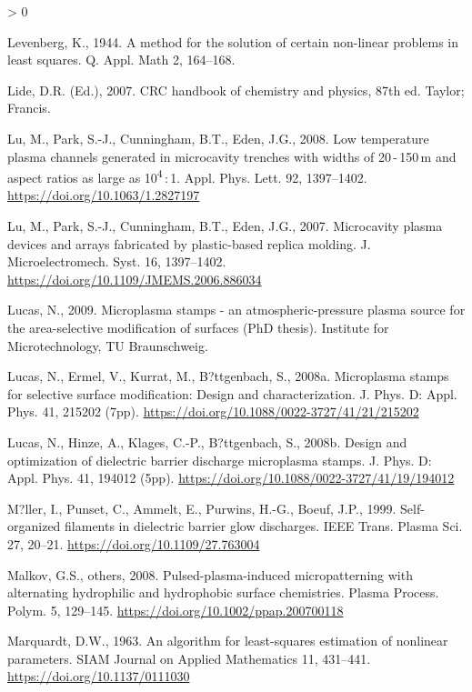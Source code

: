 \documentclass[
  11pt,
  twoside]{article}
\newlength{\cslhangindent}
\newenvironment{CSLReferences}[2] %
 {%
  \setlength{\parindent}{0pt}
  \ifodd #1 \everypar{\setlength{\hangindent}{\cslhangindent}}\ignorespaces\fi
  \ifnum #2 > 0
  \setlength{\parskip}{#2\baselineskip}
  \fi
 }%
 {}
\begin{document}
\begin{CSLReferences}{1}{0}
\leavevmode\hypertarget{ref-Leve1944}{}%
Levenberg, K., 1944. A method for the solution of certain non-linear problems in least squares. Q. Appl. Math 2, 164--168.

\leavevmode\hypertarget{ref-CRC07}{}%
Lide, D.R. (Ed.), 2007. CRC handbook of chemistry and physics, 87th ed. Taylor; Francis.

\leavevmode\hypertarget{ref-Lu08}{}%
Lu, M., Park, S.-J., Cunningham, B.T., Eden, J.G., 2008. Low temperature plasma channels generated in microcavity trenches with widths of 20 - 150 {}m and aspect ratios as large as 10\textsuperscript{4} : 1. Appl. Phys. Lett. 92, 1397--1402. \url{https://doi.org/10.1063/1.2827197}

\leavevmode\hypertarget{ref-Lu07}{}%
Lu, M., Park, S.-J., Cunningham, B.T., Eden, J.G., 2007. Microcavity plasma devices and arrays fabricated by plastic-based replica molding. J. Microelectromech. Syst. 16, 1397--1402. \url{https://doi.org/10.1109/JMEMS.2006.886034}

\leavevmode\hypertarget{ref-Luca09}{}%
Lucas, N., 2009. Microplasma stamps - an atmospheric-pressure plasma source for the area-selective modification of surfaces (PhD thesis). Institute for Microtechnology, TU Braunschweig.

\leavevmode\hypertarget{ref-Luca08-2}{}%
Lucas, N., Ermel, V., Kurrat, M., B?ttgenbach, S., 2008a. Microplasma stamps for selective surface modification: Design and characterization. J. Phys. D: Appl. Phys. 41, 215202 (7pp). \url{https://doi.org/10.1088/0022-3727/41/21/215202}

\leavevmode\hypertarget{ref-Luca08-1}{}%
Lucas, N., Hinze, A., Klages, C.-P., B?ttgenbach, S., 2008b. Design and optimization of dielectric barrier discharge microplasma stamps. J. Phys. D: Appl. Phys. 41, 194012 (5pp). \url{https://doi.org/10.1088/0022-3727/41/19/194012}

\leavevmode\hypertarget{ref-Muel1999}{}%
M?ller, I., Punset, C., Ammelt, E., Purwins, H.-G., Boeuf, J.P., 1999. Self-organized filaments in dielectric barrier glow discharges. IEEE Trans. Plasma Sci. 27, 20--21. \url{https://doi.org/10.1109/27.763004}

\leavevmode\hypertarget{ref-Malk08}{}%
Malkov, G.S., others, 2008. Pulsed-plasma-induced micropatterning with alternating hydrophilic and hydrophobic surface chemistries. Plasma Process. Polym. 5, 129--145. \url{https://doi.org/10.1002/ppap.200700118}

\leavevmode\hypertarget{ref-Marq1963}{}%
Marquardt, D.W., 1963. An algorithm for least-squares estimation of nonlinear parameters. SIAM Journal on Applied Mathematics 11, 431--441. \url{https://doi.org/10.1137/0111030}


\end{CSLReferences}
\end{document}
